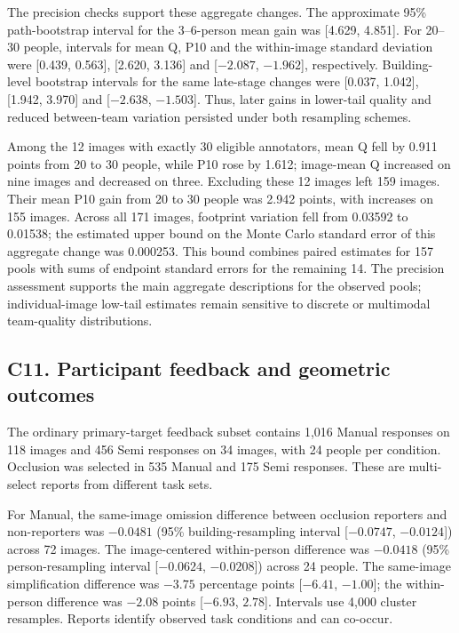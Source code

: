 \documentclass[10pt]{article}
\begin{document}
The precision checks support these aggregate changes. The approximate 95\% path-bootstrap interval for the 3--6-person mean gain was [4.629, 4.851]. For 20--30 people, intervals for mean Q, P10 and the within-image standard deviation were [0.439, 0.563], [2.620, 3.136] and [$-2.087$, $-1.962$], respectively. Building-level bootstrap intervals for the same late-stage changes were [0.037, 1.042], [1.942, 3.970] and [$-2.638$, $-1.503$]. Thus, later gains in lower-tail quality and reduced between-team variation persisted under both resampling schemes.

Among the 12 images with exactly 30 eligible annotators, mean Q fell by 0.911 points from 20 to 30 people, while P10 rose by 1.612; image-mean Q increased on nine images and decreased on three. Excluding these 12 images left 159 images. Their mean P10 gain from 20 to 30 people was 2.942 points, with increases on 155 images. Across all 171 images, footprint variation fell from 0.03592 to 0.01538; the estimated upper bound on the Monte Carlo standard error of this aggregate change was 0.000253. This bound combines paired estimates for 157 pools with sums of endpoint standard errors for the remaining 14. The precision assessment supports the main aggregate descriptions for the observed pools; individual-image low-tail estimates remain sensitive to discrete or multimodal team-quality distributions.



\subsection*{C11. Participant feedback and geometric outcomes}
The ordinary primary-target feedback subset contains 1,016 Manual responses on 118 images and 456 Semi responses on 34 images, with 24 people per condition. Occlusion was selected in 535 Manual and 175 Semi responses. These are multi-select reports from different task sets.

For Manual, the same-image omission difference between occlusion reporters and non-reporters was $-0.0481$ (95\% building-resampling interval [$-0.0747$, $-0.0124$]) across 72 images. The image-centered within-person difference was $-0.0418$ (95\% person-resampling interval [$-0.0624$, $-0.0208$]) across 24 people. The same-image simplification difference was $-3.75$ percentage points [$-6.41$, $-1.00$]; the within-person difference was $-2.08$ points [$-6.93$, $2.78$]. Intervals use 4,000 cluster resamples. Reports identify observed task conditions and can co-occur.
\end{document}
